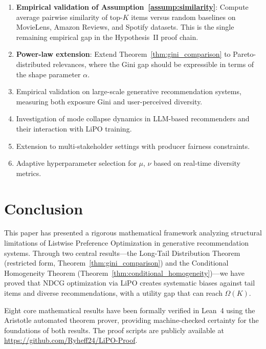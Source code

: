 \documentclass[11pt,a4paper]{article}
\theoremstyle{definition}
\theoremstyle{plain}
\theoremstyle{remark}
\begin{document}
\begin{enumerate}[label=\textbf{F.\arabic*}]
    \item \textbf{Empirical validation of Assumption~\ref{assump:similarity}}: Compute average pairwise similarity of top-$K$ items versus random baselines on MovieLens, Amazon Reviews, and Spotify datasets. This is the single remaining empirical gap in the Hypothesis~II proof chain.
    
    \item \textbf{Power-law extension}: Extend Theorem~\ref{thm:gini_comparison} to Pareto-distributed relevances, where the Gini gap should be expressible in terms of the shape parameter $\alpha$.
    
    \item Empirical validation on large-scale generative recommendation systems, measuring both exposure Gini and user-perceived diversity.
    
    \item Investigation of mode collapse dynamics in LLM-based recommenders and their interaction with LiPO training.
    
    \item Extension to multi-stakeholder settings with producer fairness constraints.
    
    \item Adaptive hyperparameter selection for $\mu$, $\nu$ based on real-time diversity metrics.
\end{enumerate}

\section{Conclusion}
\label{sec:conclusion}

This paper has presented a rigorous mathematical framework analyzing structural limitations of Listwise Preference Optimization in generative recommendation systems. Through two central results---the Long-Tail Distribution Theorem (restricted form, Theorem~\ref{thm:gini_comparison}) and the Conditional Homogeneity Theorem (Theorem~\ref{thm:conditional_homogeneity})---we have proved that NDCG optimization via LiPO creates systematic biases against tail items and diverse recommendations, with a utility gap that can reach $\Omega(K)$.

Eight core mathematical results have been formally verified in Lean~4 using the Aristotle automated theorem prover, providing machine-checked certainty for the foundations of both results. The proof scripts are publicly available at \url{https://github.com/Ryheff24/LiPO-Proof}.
\end{document}
